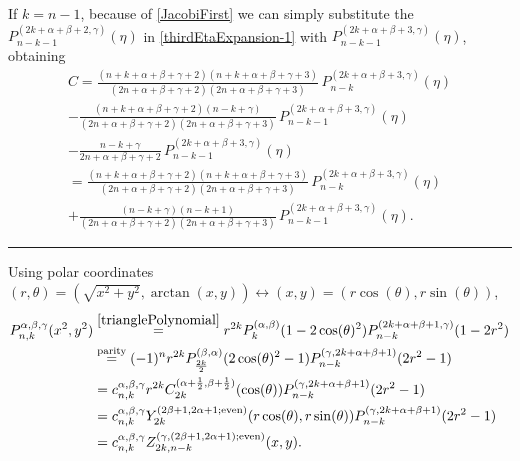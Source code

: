 \documentclass{article}
\numberwithin{equation}{section}
\numberwithin{figure}{section}
\begin{document}
%
If $k = n-1$, because of \eqref{JacobiFirst} we can simply substitute the $P^{(2k+\alpha+\beta+2,\gamma)}_{n-k-1}(\eta)$ in \eqref{thirdEtaExpansion-1} with $P^{(2k+\alpha+\beta+3,\gamma)}_{n-k-1}(\eta)$, obtaining
%
\begin{multline}\label{thirdEtaExpansion-2b}
C
= \frac{(n+k+\alpha+\beta+\gamma+2)(n+k+\alpha+\beta+\gamma+3)}{(2n+\alpha+\beta+\gamma+2)(2n+\alpha+\beta+\gamma+3)} \, P^{(2k+\alpha+\beta+3,\gamma)}_{n-k}(\eta)\\
- \frac{(n+k+\alpha+\beta+\gamma+2)(n-k+\gamma)}{(2n+\alpha+\beta+\gamma+2)(2n+\alpha+\beta+\gamma+3)} \, P^{(2k+\alpha+\beta+3,\gamma)}_{n-k-1}(\eta)\\
- \frac{n-k+\gamma}{2n+\alpha+\beta+\gamma+2} \, P^{(2k+\alpha+\beta+3,\gamma)}_{n-k-1}(\eta)\\
= \frac{(n+k+\alpha+\beta+\gamma+2)(n+k+\alpha+\beta+\gamma+3)}{(2n+\alpha+\beta+\gamma+2)(2n+\alpha+\beta+\gamma+3)} \, P^{(2k+\alpha+\beta+3,\gamma)}_{n-k}(\eta)\\
+ \frac{(n-k+\gamma)(n-k+1)}{(2n+\alpha+\beta+\gamma+2)(2n+\alpha+\beta+\gamma+3)} \, P^{(2k+\alpha+\beta+3,\gamma)}_{n-k-1}(\eta).
\end{multline}

\noindent\rule{\linewidth}{2pt}

Using polar coordinates $(r,\theta) = \left(\sqrt{x^2+y^2},\arctan(x,y)\right) \leftrightarrow (x,y) = \left(r\cos(\theta),r\sin(\theta)\right)$,
%
\begin{equation*}
\begin{split}
P^{\alpha,\beta,\gamma}_{n,k}(x^2,y^2)
& \stackrel{\eqref{trianglePolynomial}}{=} r^{2k} P^{(\alpha,\beta)}_k(1-2\cos(\theta)^2) P^{(2k+\alpha+\beta+1,\gamma)}_{n-k}(1-2r^2)\\
& \stackrel{\text{parity}}{=} (-1)^n r^{2k} P^{(\beta,\alpha)}_{\frac{2k}{2}}(2\cos(\theta)^2-1) P^{(\gamma,2k+\alpha+\beta+1)}_{n-k}(2r^2-1)\\
& = c^{\alpha,\beta,\gamma}_{n,k} r^{2k} C^{(\alpha+\frac{1}{2},\beta+\frac{1}{2})}_{2k}(\cos(\theta)) P^{(\gamma,2k+\alpha+\beta+1)}_{n-k}(2r^2-1)\\
& = c^{\alpha,\beta,\gamma}_{n,k} Y^{(2\beta+1,2\alpha+1;\textrm{even})}_{2k}(r\cos(\theta),r\sin(\theta)) P^{(\gamma,2k+\alpha+\beta+1)}_{n-k}(2r^2-1)\\
& = c^{\alpha,\beta,\gamma}_{n,k} Z^{(\gamma,(2\beta+1,2\alpha+1);\textrm{even})}_{2k,n-k}(x,y).
\end{split}
\end{equation*}
%
\end{document}

